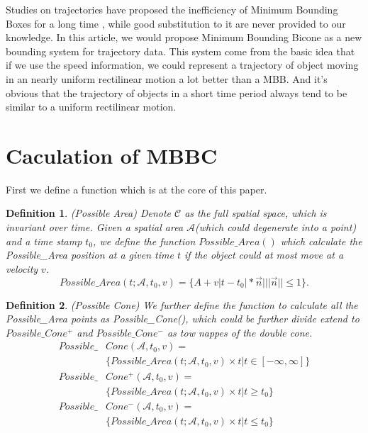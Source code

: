 \documentclass[sigplan]{acmart}
\newtheorem{myDef}{Definition}
\begin{document}
Studies on trajectories have proposed the inefficiency of Minimum Bounding Boxes for a long time \cite{pfoser2000novel}, while good substitution to it are never provided to our knowledge. In this article, we would propose Minimum Bounding Bicone as a new bounding system for trajectory data. This system come from the basic idea that if we use the speed information, we could represent a trajectory of object moving in an nearly uniform rectilinear motion a lot better than a MBB. And it's obvious that the trajectory of objects in a short time period always tend to be similar to a uniform rectilinear motion.\par



\section{Caculation of MBBC}
First we define a function which is at the core of this paper.
\begin{myDef}
  (Possible Area) Denote $\mathcal{C}$ as the full spatial space, which is invariant over time. Given a spatial area $\mathcal{A}$(which could degenerate into a point) and a time stamp $t_0$, we define the function $Possible\_Area()$ which calculate the Possible\_Area position at a given time $t$ if the object could at most move at a velocity $v$.
  $$
  Possible\_Area(t;\mathcal{A},t_0,v) = \{A+v|t-t_0|*\vec{n} \big| ||\vec{n}|| \leq 1\}.
  $$
\end{myDef}
\begin{myDef}
  (Possible Cone) We further define the function to calculate all the Possible\_Area points as Possible\_Cone(), which could be further divide extend to $Possible\_Cone^+$ and $Possible\_Cone^-$ as tow nappes of the double cone.
  $$
  \begin{aligned}
  Possible\_&Cone(\mathcal{A},t_0,v)=\\
  &\{Possible\_Area(t;\mathcal{A},t_0,v)\times t | t\in [-\infty,\infty]\}\\
  Possible\_&Cone^+(\mathcal{A},t_0,v)=\\
  &\{Possible\_Area(t;\mathcal{A},t_0,v)\times t \big | t\geq t_0\}\\
  Possible\_&Cone^-(\mathcal{A},t_0,v)=\\
  &\{Possible\_Area(t;\mathcal{A},t_0,v)\times t \big | t\leq t_0\}
  \end{aligned}
  $$
\end{myDef}
\end{document}
